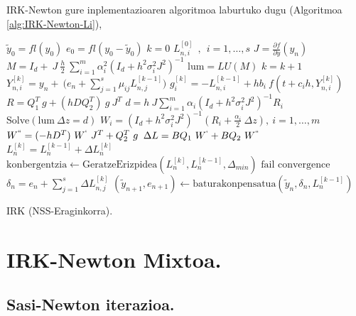 \begin{enumerate}
\end{enumerate}


IRK-Newton gure inplementazioaren algoritmoa laburtuko dugu (Algoritmoa \ref{alg:IRK-Newton-Li}), 

\begin{algorithm}[h!]
 \BlankLine
  $\tilde{y}_0=fl(y_0)$\;
  $e_0=fl(y_0-\tilde{y}_0)$\;
  {
   \BlankLine
   $k=0$\;
     $L_{n,i}^{[0]} \ \ , \ \ i=1,\dots,s $\;
   \BlankLine
   $J=\frac{\partial f}{\partial y}(y_n) $\; 
   \BlankLine
   $ M=I_d+ \ J \ \frac{h}{2}\ \sum\limits_{i=1}^{m} \alpha_i^2 (I_d+h^2 \sigma_i^2 J^2)^{-1} $\;
   $ \mathrm{lum}=LU(M)$\;
   \BlankLine  
   {
    \BlankLine 
    $k=k+1$\;
    $Y_{n,i}^{[k]}=y_{n} + \ \big(e_n+\sum\limits_{j=1}^{s} \mu_{ij} L_{n,j}^{[k-1]}\big)  $\;  
    \BlankLine
    $g_i^{[k]}= -L_{n,i}^{[k-1]}+ hb_i \ f(t+c_ih, Y_{n,i}^{[k]}) $\;
    \BlankLine
    $R=Q_1^T \ g  + (h D Q_2^T) \ g \ J^T $\;
    $d=h \ J \sum\limits_{i=1}^{m}\alpha_i (I_d+h^2\sigma_i^2J^2)^{-1}R_i$\;
    $\text{Solve}(\mathrm{lum} \ \Delta z = d)$\;
    \BlankLine 
    $W_i=(I_d+h^2\sigma_i^2J^2)^{-1} (R_i+\frac{\alpha_i}{2} \ \Delta z), \ i=1,\dots,m$\;
    \BlankLine
    $W^{``}= (-hD^T) \ W^{`} \ J^T+Q_2^T \ g$\;
    \BlankLine
    $\Delta L =B Q_1 \ W^{`}+B Q_2 \ W^{``} $\;
    $L_n^{[k]}=L_n^{[k-1]}+\Delta L_n^{[k]}$\;
    $\text{konbergentzia} \leftarrow \text{GeratzeErizpidea}(L_n^{[k]},L_n^{[k-1]},\Delta_{min}) $\;
   }
 \BlankLine
   {
    {$\text{fail convergence}$\;}
   }
   $\delta_{n}={e}_{n} + \sum\limits_{j=1}^{s}\Delta L_{n,j}^{[k]}$\;
   $(\tilde y_{n+1}, e_{n+1})\leftarrow \text{baturakonpensatua}(\tilde y_{n},\delta_{n},L_{n}^{[k-1]})$\;
 }
 \caption{IRK (NSS-Eraginkorra).}
 \label{alg:IRK-Newton-Li}
\end{algorithm}


\clearpage


\section{IRK-Newton Mixtoa.}


\subsection{Sasi-Newton iterazioa.}


